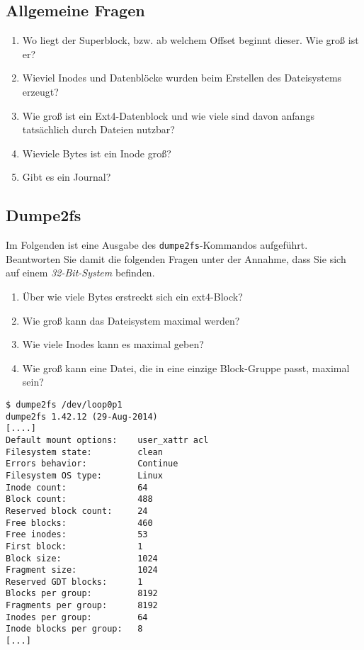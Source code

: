 \documentclass[11pt,a4paper]{article}
\def\inlinebash{\lstinline[style=bash]}
\begin{document}
\subsection{Allgemeine Fragen}
\begin{enumerate}
\item Wo liegt der Superblock, bzw. ab welchem Offset beginnt dieser.
	Wie groß ist er?
\item Wieviel Inodes und Datenblöcke wurden beim Erstellen des Dateisystems erzeugt?
\item Wie groß ist ein Ext4-Datenblock und wie viele sind davon anfangs
	tatsächlich durch Dateien nutzbar?
\item Wieviele Bytes ist ein Inode groß?
\item Gibt es ein Journal?

\end{enumerate}

\subsection{Dumpe2fs}
Im Folgenden ist eine Ausgabe des \inlinebash$dumpe2fs$-Kommandos
	aufgeführt. Beantworten Sie damit die folgenden Fragen unter der Annahme,
	dass Sie sich auf einem \emph{32-Bit-System} befinden.
	\begin{enumerate}
		\item Über wie viele Bytes erstreckt sich ein ext4-Block?
		\item Wie groß kann das Dateisystem maximal werden?
		\item Wie viele Inodes kann es maximal geben?
		\item Wie groß kann eine Datei, die in eine einzige Block-Gruppe passt,
			maximal sein?
	\end{enumerate}

	\begin{lstlisting}[style=bash]
$ dumpe2fs /dev/loop0p1
dumpe2fs 1.42.12 (29-Aug-2014)
[....]
Default mount options:    user_xattr acl
Filesystem state:         clean
Errors behavior:          Continue
Filesystem OS type:       Linux
Inode count:              64
Block count:              488
Reserved block count:     24
Free blocks:              460
Free inodes:              53
First block:              1
Block size:               1024
Fragment size:            1024
Reserved GDT blocks:      1
Blocks per group:         8192
Fragments per group:      8192
Inodes per group:         64
Inode blocks per group:   8
[...]
	\end{lstlisting}
\end{document}
